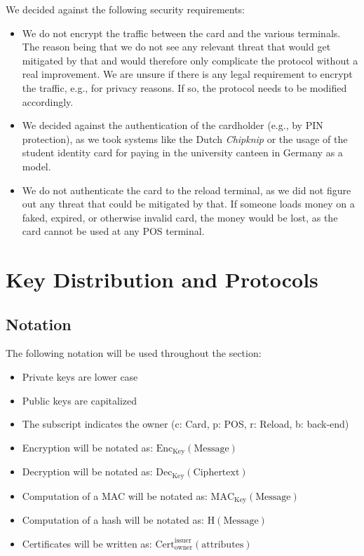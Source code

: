 We decided against the following security requirements:
\begin{itemize}
    \item We do not encrypt the traffic between the card and the various terminals.
    The reason being that we do not see any relevant threat that would get mitigated by that and would therefore only complicate the protocol without a real improvement.
    We are unsure if there is any legal requirement to encrypt the traffic, e.g., for privacy reasons.
    If so, the protocol needs to be modified accordingly.
    
    \item We decided against the authentication of the cardholder (e.g., by PIN protection), as we took systems like the Dutch \emph{Chipknip} or the usage of the student identity card for paying in the university canteen in Germany as a model.

    \item We do not authenticate the card to the reload terminal, as we did not figure out any threat that could be mitigated by that.
    If someone loads money on a faked, expired, or otherwise invalid card, the money would be lost, as the card cannot be used at any POS terminal.
\end{itemize}


\section{Key Distribution and Protocols}
\subsection{Notation}
The following notation will be used throughout the section:
\begin{itemize}
    \item Private keys are lower case
    
    \item Public keys are capitalized
    
    \item The subscript indicates the owner (c: Card, p: POS, r: Reload, b: back-end)
    
    \item Encryption will be notated as: $\textrm{Enc}_{\textrm{Key}}(\textrm{Message})$

    \item Decryption will be notated as: $\textrm{Dec}_{\textrm{Key}}(\textrm{Ciphertext})$
    
    \item Computation of a MAC will be notated as: $\textrm{MAC}_{\textrm{Key}}(\textrm{Message})$
    
    \item Computation of a hash will be notated as: $\textrm{H}(\textrm{Message})$
    
    \item Certificates will be written as: $\textrm{Cert}_\textrm{owner}^\textrm{issuer}(\textrm{attributes})$
\end{itemize}


